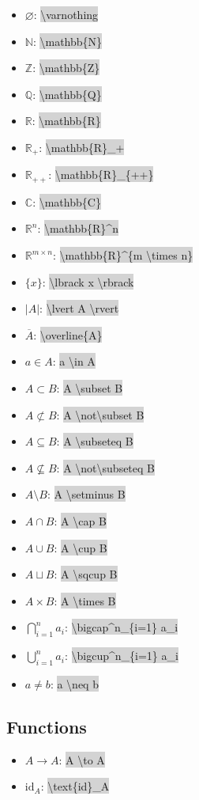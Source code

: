 \documentclass[12pt]{article}
\theoremstyle{definition}
\newcommand{\RR}{\mathbb{R}}
\newcommand{\QQ}{\mathbb{Q}}
\newcommand{\NN}{\mathbb{N}}
\newcommand{\CC}{\mathbb{C}}
\newcommand{\ltc}[1]{\colorbox{lightgray}{\textbackslash #1}}
\newcommand{\ltcc}[1]{\colorbox{lightgray}{#1}}
\newcommand{\bras}[1]{\lbrace #1 \rbrace}
\begin{document}
 	\begin{multicols}{2}
 	\begin{itemize}
	 	\item $\varnothing$: \ltc{varnothing}
 		\item $\NN$: \ltc{mathbb\{N\}}
 		\item $\mathbb{Z}$: \ltc{mathbb\{Z\}}
 		\item $\QQ$: \ltc{mathbb\{Q\}}
 		\item $\RR$: \ltc{mathbb\{R\}}
 		\item $\RR_+$: \ltc{mathbb\{R\}\_+}
 		\item $\RR_{++}$: \ltc{mathbb\{R\}\_\{++\}}
 		\item $\CC$: \ltc{mathbb\{C\}}
 		\item $\RR^n$: \ltc{mathbb\{R\}\^{}n}
 		\item $\RR^{m \times n}$: \ltc{mathbb\{R\}\^{}\{m \textbackslash times n\}}
 		\item $\bras{x}$: \ltc{lbrack x \textbackslash rbrack}
 		\item $|A|$: \ltcc{\textbackslash lvert A \textbackslash rvert}
 		\item $\overline{A}$: \ltc{overline\{A\}}
 		\item $a \in A$: \ltcc{a \textbackslash in A}
 		\item $A \subset B$: \ltcc{A \textbackslash subset B}
 		\item $A \not\subset B$: \ltcc{A \textbackslash not\textbackslash subset B}
 		\item $A \subseteq B$: \ltcc{A \textbackslash subseteq B}
 		\item $A \not\subseteq B$: \ltcc{A \textbackslash not\textbackslash subseteq B}
 		\item $A \setminus B$: \ltcc{A \textbackslash setminus B}
 		\item $A \cap B$: \ltcc{A \textbackslash cap B}
 		\item $A \cup B$: \ltcc{A \textbackslash cup B}
 		\item $A \sqcup B$: \ltcc{A \textbackslash sqcup B}
 		\item $A \times B$: \ltcc{A \textbackslash times B}
 		\item $\bigcap^n_{i=1} a_i$: \ltc{bigcap\^{}n\_\{i=1\} a\_i}
 		\item $\bigcup^n_{i=1} a_i$: \ltc{bigcup\^{}n\_\{i=1\} a\_i}
 		\item $a \neq b$: \ltcc{a \textbackslash neq b}
 	\end{itemize}	
 	\end{multicols}

	\subsection{Functions}
	
	\begin{multicols}{2}
 	\begin{itemize}
	 	\item $A \to A$: \ltcc{A \textbackslash to A}
	 	\item $\text{id}_A$: \ltc{text\{id\}\_A}
 	\end{itemize}	
 	\end{multicols}
	
\end{document}
